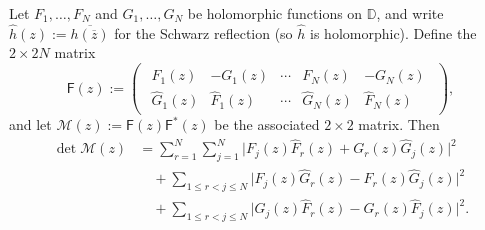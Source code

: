 \documentclass[11pt]{amsart}
\begin{document}
\begin{thm}\label{thm:detN-CB}
Let $F_1,\ldots,F_N$ and $G_1,\ldots,G_N$ be holomorphic functions on $\mathbb{D}$, and write $\hat{h}(z) := \overline{h(\overline{z})}$ for the Schwarz reflection (so $\hat h$ is holomorphic). Define the $2 \times 2N$ matrix
\begin{equation}\label{eq:tildeF-N}
\mathsf{F}(z) :=
\begin{pmatrix}
\begin{array}{cccccc}
F_1(z) & -G_1(z) & \cdots & F_N(z) & -G_N(z) \\
\hat G_1(z) & \hat F_1(z) & \cdots & \hat G_N(z) & \hat F_N(z)
\end{array}
\end{pmatrix},
\end{equation}
and let $\mathcal{M}(z) := \mathsf{F}(z)\mathsf{F}^*(z)$ be the associated $2 \times 2$ matrix. Then
\begin{equation}\label{eq:detN-CB}
\begin{aligned}
\det\mathcal{M}(z)
&= \sum_{r=1}^{N}\sum_{j=1}^{N} \bigl| F_j(z)\hat F_r(z) + G_r(z)\hat G_j(z)\bigr|^2 \\
&\quad + \sum_{1 \le r < j \le N} \bigl| F_j(z)\hat G_r(z) - F_r(z)\hat G_j(z)\bigr|^2 \\
&\quad + \sum_{1 \le r < j \le N} \bigl| G_j(z)\hat F_r(z) - G_r(z)\hat F_j(z)\bigr|^2.
\end{aligned}
\end{equation}
\end{thm}
\end{document}
